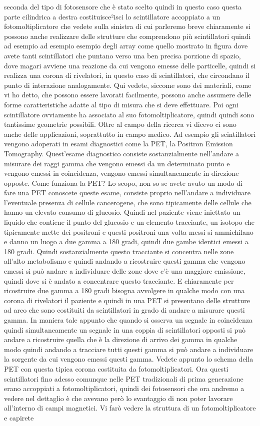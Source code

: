 seconda del tipo di fotosensore che è stato scelto quindi in questo caso questa parte cilindrica a destra costituisce²isci lo scintillatore accoppiato a un fotomoltiplicatore che vedete sulla sinistra di cui parleremo breve chiaramente si possono anche realizzare delle strutture che comprendono più scintillatori quindi ad esempio ad esempio esempio degli array come quello mostrato in figura dove avete tanti scintillatori che puntano verso una ben precisa porzione di spazio, dove magari avviene una reazione da cui vengono emesse delle particelle, quindi si realizza una corona di rivelatori, in questo caso di scintillatori, che circondano il punto di interazione analogamente. Qui vedete, siccome sono dei materiali, come vi ho detto, che possono essere lavorati facilmente, possono anche assumere delle forme caratteristiche adatte al tipo di misura che si deve effettuare. Poi ogni scintillatore ovviamente ha associato al suo fotomoltiplicatore, quindi quindi sono tantissime geometrie possibili. Oltre al campo della ricerca vi dicevo ci sono anche delle applicazioni, soprattutto in campo medico. Ad esempio gli scintillatori vengono adoperati in esami diagnostici come la PET, la Positron Emission Tomography. Quest'esame diagnostico consiste sostanzialmente nell'andare a misurare dei raggi gamma che vengono emessi da un determinato punto e vengono emessi in coincidenza, vengono emessi simultaneamente in direzione opposte. Come funziona la PET? Lo scopo, non so se avete avuto un modo di fare una PET conoscete queste esame, consiste proprio nell'andare a individuare l'eventuale presenza di cellule cancerogene, che sono tipicamente delle cellule che hanno un elevato consumo di glucosio. Quindi nel paziente viene iniettato un liquido che contiene il punto del glucosio e un elemento tracciante, un isotopo che tipicamente mette dei positroni e questi positroni una volta messi si ammichilano e danno un luogo a due gamma a 180 gradi, quindi due gambe identici emessi a 180 gradi. Quindi sostanzialmente questo tracciante si concentra nelle zone all'alto metabolismo e quindi andando a ricostruire questi gamma che vengono emessi si può andare a individuare delle zone dove c'è una maggiore emissione, quindi dove si è andato a concentrare questo tracciante. E chiaramente per ricostruire due gamma a 180 gradi bisogna avvolgere in qualche modo con una corona di rivelatori il paziente e quindi in una PET si presentano delle strutture ad arco che sono costituiti da scintillatori in grado di andare a misurare questi gamma. In maniera tale appunto che quando si osserva un segnale in coincidenza quindi simultaneamente un segnale in una coppia di scintillatori opposti si può andare a ricostruire quella che è la direzione di arrivo dei gamma in qualche modo quindi andando a tracciare tutti questi gamma si può andare a individuare la sorgente da cui vengono emessi questi gamma. Vedete appunto lo schema della PET con questa tipica corona costituita da fotomoltiplicatori. Ora questi scintillatori fino adesso comunque nelle PET tradizionali di prima generazione erano accoppiati a fotomoltiplicatori, quindi dei fotosensori che ora andremo a vedere nel dettaglio è che avevano però lo svantaggio di non poter lavorare all'interno di campi magnetici. Vi farò vedere la struttura di un fotomoltiplicatore e capirete 
